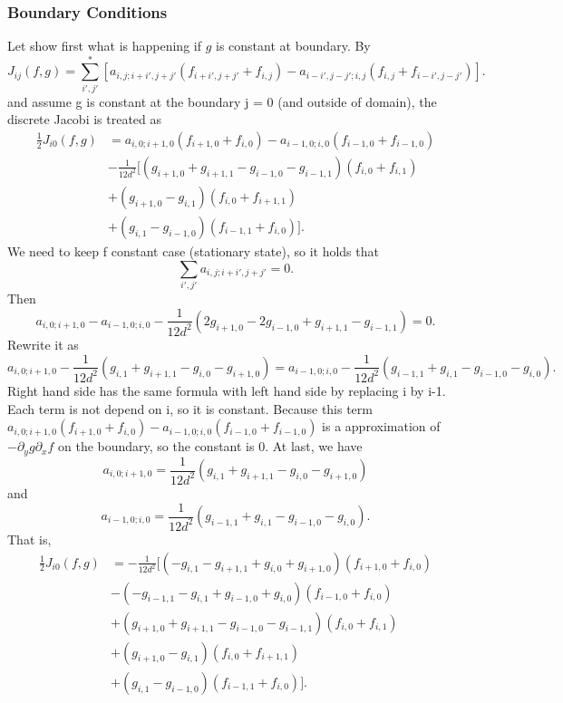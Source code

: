 \subsubsection{Boundary Conditions}

Let show first what is happening if $g$ is constant at boundary. By
\begin{equation}
    J_{ij}(f,g)=\sum^*_{i',j'}[a_{i,j;i+i',j+j'}(f_{i+i',j+j'}+f_{i,j})-a_{i-i',j-j';i,j}(f_{i,j}+f_{i-i',j-j'})].
\end{equation}
and assume g is constant at the boundary j = 0 (and outside of domain), the discrete Jacobi is treated as
\begin{equation}
\begin{aligned}
\frac{1}{2}J_{i0} (f,g) &= a_{i,0;i+1,0}(f_{i+1,0}+f_{i,0})-a_{i-1,0;i,0}(f_{i-1,0}+f_{i-1,0})\\
&-\frac{1}{12d^2}[(g_{i+1,0}+g_{i+1,1}-g_{i-1,0}-g_{i-1,1})(f_{i,0}+f_{i,1})\\
&+(g_{i+1,0}-g_{i,1})(f_{i,0}+f_{i+1,1})\\
&+(g_{i,1}-g_{i-1,0})(f_{i-1,1}+f_{i,0})].
\end{aligned}
\end{equation}
We need to keep f constant case (stationary state), so it holds that $$\sum_{i',j'} a_{i,j;i+i',j+j'}=0.$$ 
Then 
$$a_{i,0;i+1,0}-a_{i-1,0;i,0}-\frac{1}{12d^2}(2g_{i+1,0}-2g_{i-1,0}+g_{i+1,1}-g_{i-1,1})=0.$$
Rewrite it as 
$$a_{i,0;i+1,0}-\frac{1}{12d^2}(g_{i,1}+g_{i+1,1}-g_{i,0}-g_{i+1,0})=a_{i-1,0;i,0}-\frac{1}{12d^2}(g_{i-1,1}+g_{i,1}-g_{i-1,0}-g_{i,0}).$$
Right hand side has the same formula with left hand side by replacing i by i-1. Each term is not depend on i, so it is constant. Because this term $a_{i,0;i+1,0}(f_{i+1,0}+f_{i,0})-a_{i-1,0;i,0}(f_{i-1,0}+f_{i-1,0})$ is a approximation of $-\partial_y g \partial_x f$ on the boundary, so the constant is 0.
At last, we have $$a_{i,0;i+1,0}=\frac{1}{12d^2}(g_{i,1}+g_{i+1,1}-g_{i,0}-g_{i+1,0})$$ and $$a_{i-1,0;i,0}=\frac{1}{12d^2}(g_{i-1,1}+g_{i,1}-g_{i-1,0}-g_{i,0}).$$ 
That is,
\begin{equation}
\begin{aligned}
\frac{1}{2}J_{i0} (f,g) &=-\frac{1}{12d^2}[(-g_{i,1}-g_{i+1,1}+g_{i,0}+g_{i+1,0})(f_{i+1,0}+f_{i,0})\\
&-(-g_{i-1,1}-g_{i,1}+g_{i-1,0}+g_{i,0})(f_{i-1,0}+f_{i,0})\\
&+(g_{i+1,0}+g_{i+1,1}-g_{i-1,0}-g_{i-1,1})(f_{i,0}+f_{i,1})\\
&+(g_{i+1,0}-g_{i,1})(f_{i,0}+f_{i+1,1})\\
&+(g_{i,1}-g_{i-1,0})(f_{i-1,1}+f_{i,0})].
\end{aligned}
\end{equation}
